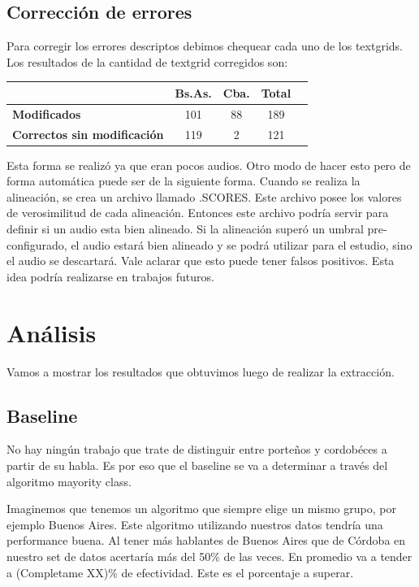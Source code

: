 \documentclass[11pt,a4paper,twoside]{tesis}
\begin{document}
\section{Corrección de errores}

Para corregir los errores descriptos debimos chequear cada uno de los textgrids. Los resultados de la cantidad de textgrid corregidos son:

\begin{table}[h]
\centering
\begin{tabular}{|l|c|c|c|c|}
\hline
\textbf{}  & \textbf{Bs.As. } & \textbf{Cba.} & \textbf{Total} \\ \hline
\textbf{Modificados}  & 101 & 88 & 189 \\ \hline
\textbf{Correctos sin modificación}  & 119 & 2 & 121 \\ \hline
\end{tabular}
\end{table}

Esta forma se realizó ya que eran pocos audios. Otro modo de hacer esto pero de forma automática puede ser de la siguiente forma. Cuando se realiza la alineación, se crea un archivo llamado .SCORES. Este archivo posee los valores de verosimilitud de cada alineación. Entonces este archivo podría servir para definir si un audio esta bien alineado. Si la alineación superó un umbral pre-configurado, el audio estará bien alineado y se podrá utilizar para el estudio, sino el audio se descartará. Vale aclarar que esto puede tener falsos positivos. Esta idea podría realizarse en trabajos futuros.

\chapter{Análisis}

Vamos a mostrar los resultados que obtuvimos luego de realizar la extracción.

\section{Baseline}

No hay ningún trabajo que trate de distinguir entre porteños y cordobéces a partir de su habla. Es por eso que el baseline se va a determinar a través del algoritmo mayority class.

Imaginemos que tenemos un algoritmo que siempre elige un mismo grupo, por ejemplo Buenos Aires. Este algoritmo utilizando nuestros datos tendría una performance buena. Al tener más hablantes de Buenos Aires que de Córdoba en nuestro set de datos acertaría más del 50\% de las veces. En promedio va a tender a (Completame XX)\% de efectividad. Este es el porcentaje a superar. 
\end{document}
